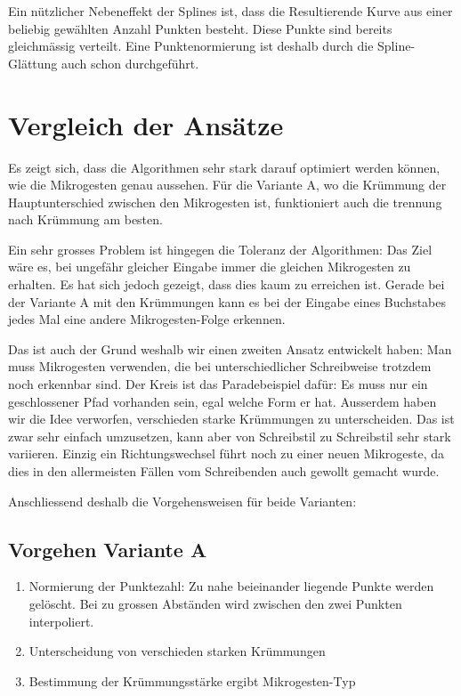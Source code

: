 Ein nützlicher Nebeneffekt der Splines ist, dass die Resultierende Kurve aus einer beliebig gewählten Anzahl Punkten besteht. Diese Punkte sind bereits gleichmässig verteilt. Eine Punktenormierung ist deshalb durch die Spline-Glättung auch schon durchgeführt.


\section{Vergleich der Ansätze}
Es zeigt sich, dass die Algorithmen sehr stark darauf optimiert werden können, wie die Mikrogesten genau aussehen. Für die Variante A, wo die Krümmung der Hauptunterschied zwischen den Mikrogesten ist, funktioniert auch die trennung nach Krümmung am besten.

Ein sehr grosses Problem ist hingegen die Toleranz der Algorithmen: Das Ziel wäre es, bei ungefähr gleicher Eingabe immer die gleichen Mikrogesten zu erhalten. Es hat sich jedoch gezeigt, dass dies kaum zu erreichen ist. Gerade bei der Variante A mit den Krümmungen kann es bei der Eingabe eines Buchstabes jedes Mal eine andere Mikrogesten-Folge erkennen. 

Das ist auch der Grund weshalb wir einen zweiten Ansatz entwickelt haben: Man muss Mikrogesten verwenden, die bei unterschiedlicher Schreibweise trotzdem noch erkennbar sind. Der Kreis ist das Paradebeispiel dafür: Es muss nur ein geschlossener Pfad vorhanden sein, egal welche Form er hat. Ausserdem haben wir die Idee verworfen, verschieden starke Krümmungen zu unterscheiden. Das ist zwar sehr einfach umzusetzen, kann aber von Schreibstil zu Schreibstil sehr stark variieren. Einzig ein Richtungswechsel führt noch zu einer neuen Mikrogeste, da dies in den allermeisten Fällen vom Schreibenden auch gewollt gemacht wurde.

Anschliessend deshalb die Vorgehensweisen für beide Varianten:

\subsection{Vorgehen Variante A}
\begin{enumerate}
	\item Normierung der Punktezahl: Zu nahe beieinander liegende Punkte werden gelöscht. Bei zu grossen Abständen wird zwischen den zwei Punkten interpoliert.
	\item Unterscheidung von verschieden starken Krümmungen
	\item Bestimmung der Krümmungsstärke ergibt Mikrogesten-Typ
\end{enumerate}

